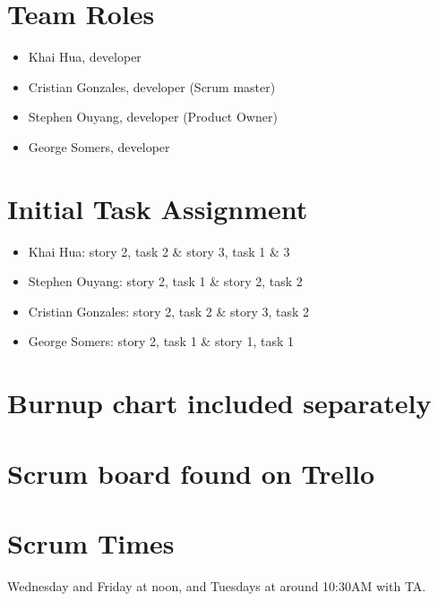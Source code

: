 \documentclass[11pt]{article}
\begin{document}
	\section{Team Roles}
		\vspace{-3mm}
		\begin{itemize}
		    \item Khai Hua, developer
		    \item Cristian Gonzales, developer (Scrum master)
		    \item Stephen Ouyang, developer (Product Owner)
		    \item George Somers, developer
		\end{itemize}
	\section{Initial Task Assignment}
	    \vspace{-3mm}
	    \begin{itemize}
		    \item Khai Hua: story 2, task 2 \& story 3, task 1 \& 3
		    \item Stephen Ouyang: story 2, task 1 \& story 2, task 2
		    \item Cristian Gonzales: story 2, task 2 \& story 3, task 2
		    \item George Somers: story 2, task 1 \& story 1, task 1
		\end{itemize}
	\section{Burnup chart included separately}
	\section{Scrum board found on Trello}
	\section{Scrum Times}
	    Wednesday and Friday at noon, and Tuesdays at around 10:30AM with TA.
\end{document}
